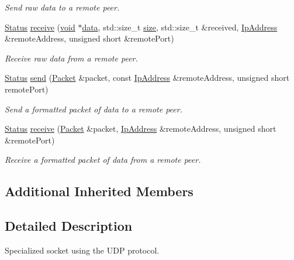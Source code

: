 \begin{DoxyCompactItemize}
\begin{DoxyCompactList}\small\item\em Send raw data to a remote peer. \end{DoxyCompactList}\item 
\hyperlink{classsf_1_1_socket_a51bf0fd51057b98a10fbb866246176dc}{Status} \hyperlink{classsf_1_1_udp_socket_ade9ca0f7ed7919136917b0b997a9833a}{receive} (\hyperlink{glutf90_8h_ac778d6f63f1aaf8ebda0ce6ac821b56e}{void} $\ast$\hyperlink{gl3_8h_a0f78eecb0891cce3bdfc815b971866a1}{data}, std\-::size\-\_\-t \hyperlink{gl3_8h_a79ef9eb3e59c4bb34c4b9fbeb8d28ff7}{size}, std\-::size\-\_\-t \&received, \hyperlink{classsf_1_1_ip_address}{Ip\-Address} \&remote\-Address, unsigned short \&remote\-Port)
\begin{DoxyCompactList}\small\item\em Receive raw data from a remote peer. \end{DoxyCompactList}\item 
\hyperlink{classsf_1_1_socket_a51bf0fd51057b98a10fbb866246176dc}{Status} \hyperlink{classsf_1_1_udp_socket_a48969a62c80d40fd74293a740798e435}{send} (\hyperlink{classsf_1_1_packet}{Packet} \&packet, const \hyperlink{classsf_1_1_ip_address}{Ip\-Address} \&remote\-Address, unsigned short remote\-Port)
\begin{DoxyCompactList}\small\item\em Send a formatted packet of data to a remote peer. \end{DoxyCompactList}\item 
\hyperlink{classsf_1_1_socket_a51bf0fd51057b98a10fbb866246176dc}{Status} \hyperlink{classsf_1_1_udp_socket_afdd5c655d00c96222d5b477fc057a22b}{receive} (\hyperlink{classsf_1_1_packet}{Packet} \&packet, \hyperlink{classsf_1_1_ip_address}{Ip\-Address} \&remote\-Address, unsigned short \&remote\-Port)
\begin{DoxyCompactList}\small\item\em Receive a formatted packet of data from a remote peer. \end{DoxyCompactList}\end{DoxyCompactItemize}
\subsection*{Additional Inherited Members}


\subsection{Detailed Description}
Specialized socket using the U\-D\-P protocol. 

